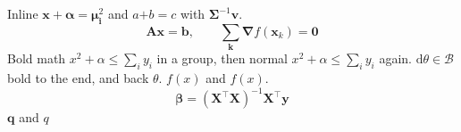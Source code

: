 \documentclass{article}
\begin{document}
Inline $\boldsymbol{x} + \boldsymbol{\alpha} = \boldsymbol{\mu}_{\boldsymbol{i}}^2$
and $a \boldsymbol{+} b \boldsymbol{=} c$ with $\boldsymbol{\Sigma}^{-1}\boldsymbol{v}$.
\[
  \boldsymbol{A}\boldsymbol{x} = \boldsymbol{b}, \qquad
  \sum_{\boldsymbol{k}} \boldsymbol{\nabla} f(\boldsymbol{x}_k) = \boldsymbol{0}
\]
{\boldmath Bold math $x^2 + \alpha \le \sum_i y_i$ in a group,} then
normal $x^2 + \alpha \le \sum_i y_i$ again.
\boldmath $\mathrm{d}\theta \in \mathcal{B}$ bold to the end,
\unboldmath and back $\theta$.
{$f(x)$} and $f(x)$.
\begin{equation}
  \boldsymbol{\beta} = (\boldsymbol{X}^{\top}\boldsymbol{X})^{-1}\boldsymbol{X}^{\top}\boldsymbol{y}
\end{equation}
{\large $\boldsymbol{q}$ and \boldmath $q$}
\end{document}
